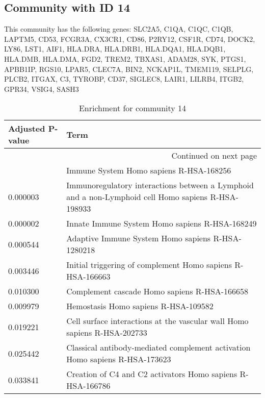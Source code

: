 \subsection*{Community with ID 14}
This community has the following genes: SLC2A5, C1QA, C1QC, C1QB, LAPTM5, CD53, FCGR3A, CX3CR1, CD86, P2RY12, CSF1R, CD74, DOCK2, LY86, LST1, AIF1, HLA.DRA, HLA.DRB1, HLA.DQA1, HLA.DQB1, HLA.DMB, HLA.DMA, FGD2, TREM2, TBXAS1, ADAM28, SYK, PTGS1, APBB1IP, RGS10, LPAR5, CLEC7A, BIN2, NCKAP1L, TMEM119, SELPLG, PLCB2, ITGAX, C3, TYROBP, CD37, SIGLEC8, LAIR1, LILRB4, ITGB2, GPR34, VSIG4, SASH3
\\
\begin{longtable}{p{2.4cm}p{14.5cm}}
\caption{Enrichment for community 14}\\
\toprule
Adjusted \newline P-value &                                                                                                Term \\
\midrule
\endhead
\midrule
\multicolumn{2}{r}{{Continued on next page}} \\
\midrule
\endfoot

\bottomrule
\endlastfoot
                 0.000001 &                                                             Immune System Homo sapiens R-HSA-168256 \\
                 0.000003 &  Immunoregulatory interactions between a Lymphoid and a non-Lymphoid cell Homo sapiens R-HSA-198933 \\
                 0.000002 &                                                      Innate Immune System Homo sapiens R-HSA-168249 \\
                 0.000544 &                                                   Adaptive Immune System Homo sapiens R-HSA-1280218 \\
                 0.003446 &                                          Initial triggering of complement Homo sapiens R-HSA-166663 \\
                 0.010300 &                                                        Complement cascade Homo sapiens R-HSA-166658 \\
                 0.009979 &                                                                Hemostasis Homo sapiens R-HSA-109582 \\
                 0.019221 &                            Cell surface interactions at the vascular wall Homo sapiens R-HSA-202733 \\
                 0.025442 &                         Classical antibody-mediated complement activation Homo sapiens R-HSA-173623 \\
                 0.033841 &                                          Creation of C4 and C2 activators Homo sapiens R-HSA-166786 \\
\end{longtable}


